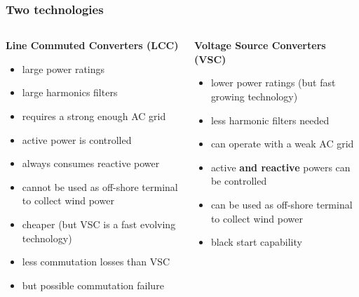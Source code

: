 \begin{frame}
\frametitle{Two technologies}
\begin{columns}
\begin{column}{0.6\linewidth}
\textbf{Line Commuted Converters (LCC)}
\begin{itemize}
    \item large power ratings
    \item large harmonics filters
    \item requires a strong enough AC grid
    \item active power is controlled
    \item always consumes reactive power
    \item cannot be used as off-shore terminal to collect wind power
    \item cheaper (but VSC is a fast evolving technology)
    \item less commutation losses than VSC
    \item but possible commutation failure
\end{itemize}
\end{column}
\begin{column}{0.4\linewidth}
\textbf{Voltage Source Converters (VSC)}
\begin{itemize}
    \item lower power ratings (but fast growing technology)
    \item less harmonic filters needed
    \item can operate with a weak AC grid
    \item active \textbf{and reactive} powers can be controlled
    \item can be used as off-shore terminal to collect wind power
    \item black start capability
\end{itemize}
\end{column}
\end{columns}
\end{frame}


